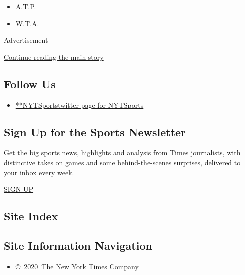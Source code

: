 \begin{itemize}
\tightlist
\item
  \protect\hyperlink{}{A.T.P.}
\item
  \protect\hyperlink{}{W.T.A.}
\end{itemize}

Advertisement

\protect\hyperlink{after-mktg}{Continue reading the main story}

\hypertarget{follow-us}{%
\subsection{Follow Us}\label{follow-us}}

\begin{itemize}
\tightlist
\item
  \href{https://twitter.com/NYTSports}{**NYTSportstwitter page for
  NYTSports}
\end{itemize}

\hypertarget{sign-up-for-the-sports-newsletter}{%
\subsection{Sign Up for the Sports
Newsletter}\label{sign-up-for-the-sports-newsletter}}

Get the big sports news, highlights and analysis from Times journalists,
with distinctive takes on games and some behind-the-scenes surprises,
delivered to your inbox every week.

\href{/newsletters/signup/SP}{SIGN UP}

\hypertarget{site-index}{%
\subsection{Site Index}\label{site-index}}

\hypertarget{site-information-navigation}{%
\subsection{Site Information
Navigation}\label{site-information-navigation}}

\begin{itemize}
\tightlist
\item
  \href{https://help.nytimes.com/hc/en-us/articles/115014792127-Copyright-notice}{©~2020~The
  New York Times Company}
\end{itemize}

